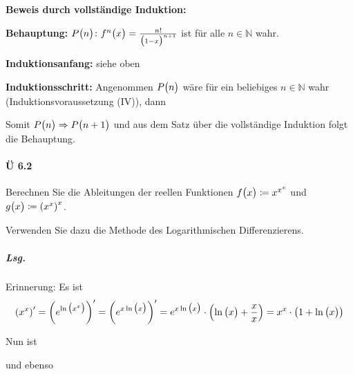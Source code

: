 \documentclass{scrreprt}
\begin{document}
\begin{enumerate}[(i)]
  \textbf{Beweis durch vollständige Induktion:}

  \textbf{Behauptung:} $P\qty\big(n) \colon f^{n} \qty\big(x) = \frac{n!}{\qty\big(1 - x)^{n + 1}}$
  ist für alle $n \in \mathbb{N}$ wahr.

  \textbf{Induktionsanfang:} siehe oben

  \textbf{Induktionsschritt:} Angenommen $P\qty\big(n)$ wäre für ein beliebiges
  $n \in \mathbb{N}$ wahr (Induktionsvoraussetzung (IV)), dann
  Somit $P\qty\big(n) \Rightarrow P\qty\big(n + 1)$ und aus dem Satz über die
  vollständige Induktion folgt die Behauptung.
\end{enumerate}

\paragraph{Ü 6.2} Berechnen Sie die Ableitungen der reellen Funktionen
$f\qty\big(x) \coloneqq x^{x^x}$ und $g\qty\big(x) \coloneqq \qty(x^x)^x$.

Verwenden Sie dazu die Methode des Logarithmischen Differenzierens.

\subparagraph{Lsg.} Erinnerung: Es ist
\[
  \qty(x^x)' = \qty(e^{\ln\qty\big(x^x)})' = \qty(e^{x\ln\qty\big(x)})'
  = e^{x\ln\qty\big(x)} \cdot \qty(\ln\qty\big(x) + \frac{x}{x})
  = x^x \cdot \qty(1 + \ln\qty\big(x))
\]

Nun ist
und ebenso
\end{document}
